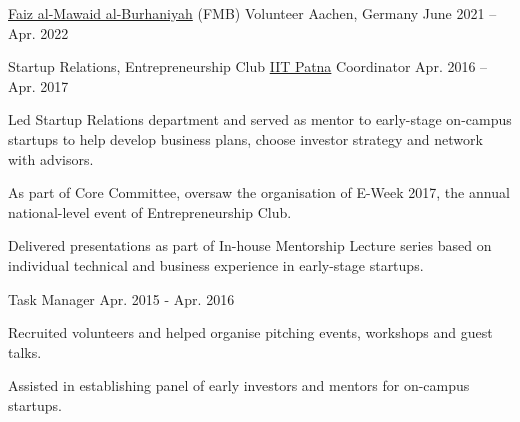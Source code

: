 
\begin{cvpositions}

\cvrole
	{\href{https://www.thedawoodibohras.com/about-the-bohras/faiz-al-mawaid-al-burhaniyah/}{Faiz al-Mawaid al-Burhaniyah} (FMB)} %
	{Volunteer} %
	{Aachen, Germany} %
	{June 2021 -- Apr. 2022} %
	{\begin{cvitems} %
		\item {}
	\end{cvitems}}


\cvroletwo
	{Startup Relations, Entrepreneurship Club} %
	{\href{https://www.iitp.ac.in}{IIT Patna}} %
	{Coordinator} %
	{Apr. 2016 -- Apr. 2017} %
	{\begin{cvitems} %
		\item {Led Startup Relations department and served as mentor to early-stage on-campus startups to help develop business plans, choose investor strategy and network with advisors.}
		\item {As part of Core Committee, oversaw the organisation of E-Week 2017, the annual national-level event of Entrepreneurship Club.}
		\item {Delivered presentations as part of In-house Mentorship Lecture series based on individual technical and business experience in early-stage startups.}
	\end{cvitems}}
	{Task Manager} %
	{Apr. 2015 - Apr. 2016} %
	{\begin{cvitems} %
		\item {Recruited volunteers and helped organise pitching events, workshops and guest talks.}
		\item {Assisted in establishing panel of early investors and mentors for on-campus startups.}
	\end{cvitems}}

\end{cvpositions}
